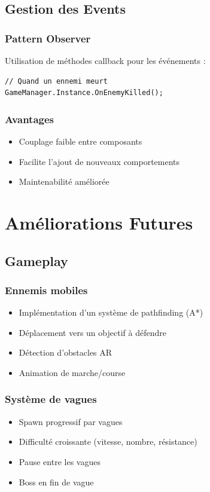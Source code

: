 \documentclass[12pt,a4paper]{article}
\begin{document}
\subsection{Gestion des Events}

\subsubsection{Pattern Observer}
Utilisation de méthodes callback pour les événements :
\begin{lstlisting}
// Quand un ennemi meurt
GameManager.Instance.OnEnemyKilled();
\end{lstlisting}

\subsubsection{Avantages}
\begin{itemize}
    \item Couplage faible entre composants
    \item Facilite l'ajout de nouveaux comportements
    \item Maintenabilité améliorée
\end{itemize}

\section{Améliorations Futures}

\subsection{Gameplay}

\subsubsection{Ennemis mobiles}
\begin{itemize}
    \item Implémentation d'un système de pathfinding (A*)
    \item Déplacement vers un objectif à défendre
    \item Détection d'obstacles AR
    \item Animation de marche/course
\end{itemize}

\subsubsection{Système de vagues}
\begin{itemize}
    \item Spawn progressif par vagues
    \item Difficulté croissante (vitesse, nombre, résistance)
    \item Pause entre les vagues
    \item Boss en fin de vague
\end{itemize}
\end{document}

